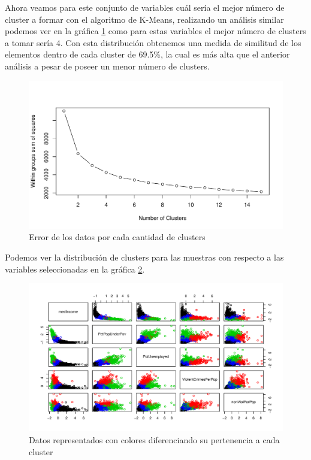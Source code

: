\documentclass[a4paper,10pt,twocolumn]{article}
\begin{document}
	Ahora veamos para este conjunto de variables cuál sería el mejor número de cluster a formar con el algoritmo de K-Means, realizando un análisis similar podemos ver en la gráfica \ref{fig:cluster_n_2} como para estas variables el mejor número de clusters a tomar sería 4. Con esta distribución obtenemos una medida de similitud de los elementos dentro de cada cluster de 69.5\%, la cual es más alta que el anterior análisis a pesar de poseer un menor número de clusters.

	\begin{figure}[htb]
		\begin{center}
			\includegraphics[width=\columnwidth]{figures/cluster_n_2.pdf}
		\end{center}
		\caption{Error de los datos por cada cantidad de clusters \label{fig:cluster_n_2}}%
	\end{figure}

	Podemos ver la distribución de clusters para las muestras con respecto a las variables seleccionadas en la gráfica \ref{fig:plot_clusters}.

	\begin{figure}[htb]
		\begin{center}
			\includegraphics[width=\columnwidth]{figures/plot_clusters.pdf}
		\end{center}
		\caption{Datos representados con colores diferenciando su pertenencia a cada cluster \label{fig:plot_clusters}}%
	\end{figure}
\end{document}
